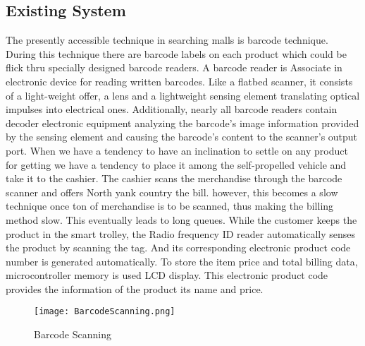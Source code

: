 \documentclass[12pt]{article}
\begin{document}
\subsection{Existing System}
\hspace*{1 cm}The presently accessible technique in searching malls is barcode technique. During this technique there are barcode labels on each product which could be flick thru specially designed barcode readers. A barcode reader is Associate in electronic   device   for   reading   written   barcodes. Like   a flatbed scanner, it consists of a light-weight offer, a lens and   a lightweight sensing element translating   optical   impulses   into electrical ones. Additionally, nearly all barcode readers contain decoder electronic equipment analyzing the barcode’s image information provided by the sensing element and causing the barcode’s content to the scanner's output port. When we have a tendency to  have an inclination to settle on any product for getting we have a tendency to place it among  the self-propelled vehicle  and  take  it  to  the  cashier.  The cashier scans the merchandise through the barcode scanner and offers North yank country the bill. however, this becomes a slow technique once ton of merchandise is to be scanned, thus making the billing method slow. This eventually leads to long queues. While the customer keeps the product in the smart trolley, the Radio frequency ID reader automatically senses the product by scanning the tag. And its corresponding electronic product code number is generated automatically. To store the item price and total billing data, microcontroller memory is used LCD display. This electronic product code provides the information of the product its name and price.
\begin{figure}[h]
\texttt{[image: BarcodeScanning.png]}
\centering
\caption{Barcode Scanning}
\end{figure}
\end{document}
